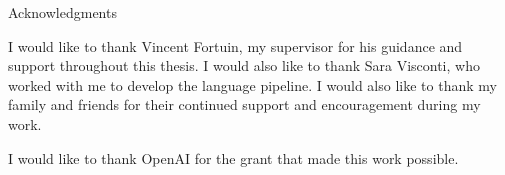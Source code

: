 \thispagestyle{empty}

\vspace*{20mm}

\begin{center}
    { Acknowledgments}
\end{center}

\vspace{10mm}

I would like to thank Vincent Fortuin, my supervisor for his guidance and support throughout this thesis. I would also like to thank Sara Visconti,
who worked with me to develop the language pipeline. I would also like to thank my family and friends for their continued support and encouragement during my work.

I would like to thank OpenAI for the grant that made this work possible.



\cleardoublepage{}
